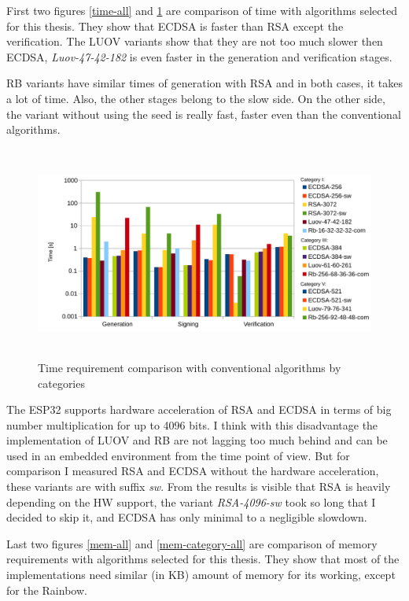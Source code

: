 \documentclass[thesis=M,english]{FITthesis}[2019/12/23]
\begin{document}
\noindent
First two figures \ref{time-all} and \ref{time-category-all} are comparison of time with algorithms selected for this thesis. They show that ECDSA is faster than RSA except the verification. The LUOV variants show that they are not too much slower then ECDSA, \textit{Luov-47-42-182} is even faster in the generation and verification stages.

\bigskip
\noindent
RB variants have similar times of generation with RSA and in both cases, it takes a lot of time. Also, the other stages belong to the slow side. On the other side, the variant without using the seed is really fast, faster even than the conventional algorithms.

\begin{figure}[H]
\centering
\includegraphics[width=13cm,height=7cm]{images/time-category-all.pdf}
\caption{Time requirement comparison with conventional algorithms by categories}
\label{time-category-all}
\end{figure}

\bigskip
\noindent
The ESP32 supports hardware acceleration of RSA and ECDSA in terms of big number multiplication for up to 4096 bits. I think with this disadvantage the implementation of LUOV and RB are not lagging too much behind and can be used in an embedded environment from the time point of view. But for comparison I measured RSA and ECDSA without the hardware acceleration, these variants are with suffix \textit{sw}. From the results is visible that RSA is heavily depending on the HW support, the variant \textit{RSA-4096-sw} took so long that I decided to skip it, and ECDSA has only minimal to a negligible slowdown.

\bigskip
\noindent
Last two figures \ref{mem-all} and \ref{mem-category-all} are comparison of memory requirements with algorithms selected for this thesis. They show that most of the implementations need similar (in KB) amount of memory for its working, except for the Rainbow.
\end{document}
